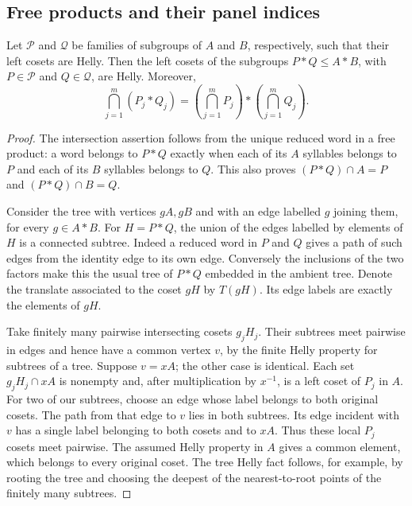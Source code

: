 \subsection{Free products and their panel indices}
\begin{lemma}\label{F-lem:free-helly}
Let $\mathcal P$ and $\mathcal Q$ be families of subgroups of $A$ and
$B$, respectively, such that their left cosets are Helly. Then the
left cosets of the subgroups $P*Q\leq A*B$, with
$P\in\mathcal P$ and $Q\in\mathcal Q$, are Helly. Moreover,
\[
 \bigcap_{j=1}^m(P_j*Q_j)
   =\left(\bigcap_{j=1}^mP_j\right)*
     \left(\bigcap_{j=1}^mQ_j\right).
\]
\end{lemma}
\begin{proof}
The intersection assertion follows from the unique reduced word in a
free product: a word belongs to $P*Q$ exactly when each of its
$A$ syllables belongs to $P$ and each of its $B$ syllables belongs to
$Q$. This also proves $(P*Q)\cap A=P$ and $(P*Q)\cap B=Q$.

Consider the tree with vertices $gA,gB$ and with an edge labelled $g$
joining them, for every $g\in A*B$. For $H=P*Q$, the union of the
edges labelled by elements of $H$ is a connected subtree. Indeed a
reduced word in $P$ and $Q$ gives a path of such edges from the
identity edge to its own edge. Conversely the inclusions of the two
factors make this the usual tree of $P*Q$ embedded in the ambient
tree. Denote the translate associated to the coset $gH$ by $T(gH)$.
Its edge labels are exactly the elements of $gH$.

Take finitely many pairwise intersecting cosets $g_jH_j$. Their
subtrees meet pairwise in edges and hence have a common vertex $v$,
by the finite Helly property for subtrees of a tree. Suppose
$v=xA$; the other case is identical. Each set
$g_jH_j\cap xA$ is nonempty and, after multiplication by $x^{-1}$,
is a left coset of $P_j$ in $A$. For two of our subtrees, choose an
edge whose label belongs to both original cosets. The path from that
edge to $v$ lies in both subtrees. Its edge incident with $v$ has a
single label belonging to both cosets and to $xA$. Thus these local
$P_j$ cosets meet pairwise. The assumed Helly property in $A$ gives a
common element, which belongs to every original coset. The tree
Helly fact follows, for example, by rooting the tree and choosing the
deepest of the nearest-to-root points of the finitely many subtrees.
\end{proof}

